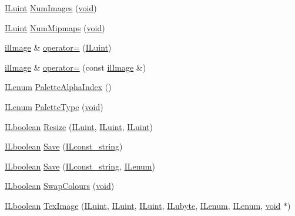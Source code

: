 \begin{DoxyCompactItemize}
\item 
\hyperlink{il_8h_ac6508d0e9c19e32f32e00d54b5b8cf30}{I\-Luint} \hyperlink{classil_image_af20ba221c46086768b901ca3a874b92b}{Num\-Images} (\hyperlink{il_8h_a5530e04d947bcddd83639ea7940faf10}{void})
\item 
\hyperlink{il_8h_ac6508d0e9c19e32f32e00d54b5b8cf30}{I\-Luint} \hyperlink{classil_image_a47369d8c330f3e93736ba1ad0b0269b9}{Num\-Mipmaps} (\hyperlink{il_8h_a5530e04d947bcddd83639ea7940faf10}{void})
\item 
\hyperlink{classil_image}{il\-Image} \& \hyperlink{classil_image_a5af60584776ba17f91a1cd464d243599}{operator=} (\hyperlink{il_8h_ac6508d0e9c19e32f32e00d54b5b8cf30}{I\-Luint})
\item 
\hyperlink{classil_image}{il\-Image} \& \hyperlink{classil_image_a9d0ef22cde51b795ae157b2ab609ee4a}{operator=} (const \hyperlink{classil_image}{il\-Image} \&)
\item 
\hyperlink{il_8h_a1542f3a70c0c5370a30a1fa5ce349e2d}{I\-Lenum} \hyperlink{classil_image_a7fcc7ea4facda455feb959210bdc5ad5}{Palette\-Alpha\-Index} ()
\item 
\hyperlink{il_8h_a1542f3a70c0c5370a30a1fa5ce349e2d}{I\-Lenum} \hyperlink{classil_image_a01a6fd9cfeb80b8ef34c0a64eb2c18d3}{Palette\-Type} (\hyperlink{il_8h_a5530e04d947bcddd83639ea7940faf10}{void})
\item 
\hyperlink{il_8h_a8be80d75c2c636b9f2250fe10c2e7874}{I\-Lboolean} \hyperlink{classil_image_a817e0a674b5e327e69fac5c974ce34f8}{Resize} (\hyperlink{il_8h_ac6508d0e9c19e32f32e00d54b5b8cf30}{I\-Luint}, \hyperlink{il_8h_ac6508d0e9c19e32f32e00d54b5b8cf30}{I\-Luint}, \hyperlink{il_8h_ac6508d0e9c19e32f32e00d54b5b8cf30}{I\-Luint})
\item 
\hyperlink{il_8h_a8be80d75c2c636b9f2250fe10c2e7874}{I\-Lboolean} \hyperlink{classil_image_affd4f053320f9f162b9859c94aef6c55}{Save} (\hyperlink{il_8h_a103ef32cc870d648d471aff6c7076747}{I\-Lconst\-\_\-string})
\item 
\hyperlink{il_8h_a8be80d75c2c636b9f2250fe10c2e7874}{I\-Lboolean} \hyperlink{classil_image_a1a117ce6851ca206d33612c813fe6ede}{Save} (\hyperlink{il_8h_a103ef32cc870d648d471aff6c7076747}{I\-Lconst\-\_\-string}, \hyperlink{il_8h_a1542f3a70c0c5370a30a1fa5ce349e2d}{I\-Lenum})
\item 
\hyperlink{il_8h_a8be80d75c2c636b9f2250fe10c2e7874}{I\-Lboolean} \hyperlink{classil_image_a2f7b2b43462accfa50ef62582d6404e1}{Swap\-Colours} (\hyperlink{il_8h_a5530e04d947bcddd83639ea7940faf10}{void})
\item 
\hyperlink{il_8h_a8be80d75c2c636b9f2250fe10c2e7874}{I\-Lboolean} \hyperlink{classil_image_a49880b8cf83ab237193564a9fe2adde5}{Tex\-Image} (\hyperlink{il_8h_ac6508d0e9c19e32f32e00d54b5b8cf30}{I\-Luint}, \hyperlink{il_8h_ac6508d0e9c19e32f32e00d54b5b8cf30}{I\-Luint}, \hyperlink{il_8h_ac6508d0e9c19e32f32e00d54b5b8cf30}{I\-Luint}, \hyperlink{il_8h_a8d2f04500100a86d1b00e98ab1b15a33}{I\-Lubyte}, \hyperlink{il_8h_a1542f3a70c0c5370a30a1fa5ce349e2d}{I\-Lenum}, \hyperlink{il_8h_a1542f3a70c0c5370a30a1fa5ce349e2d}{I\-Lenum}, \hyperlink{il_8h_a5530e04d947bcddd83639ea7940faf10}{void} $\ast$)

\end{DoxyCompactItemize}
